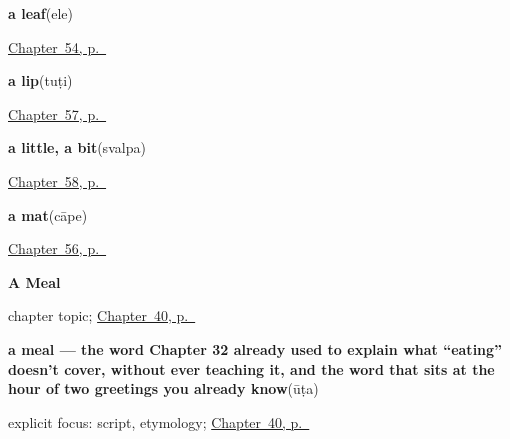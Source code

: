 \noindent\begin{minipage}[t]{\linewidth}
\raggedright
\textbf{a leaf}\enspace\emph{}\enspace(ele)\par
\footnotesize \hyperref[ch:ka-tree]{Chapter~54, p.~\pageref*{ch:ka-tree}}
\end{minipage}\par\smallskip

\noindent\begin{minipage}[t]{\linewidth}
\raggedright
\textbf{a lip}\enspace\emph{}\enspace(tuṭi)\par
\footnotesize \hyperref[ch:ka-more-body]{Chapter~57, p.~\pageref*{ch:ka-more-body}}
\end{minipage}\par\smallskip

\noindent\begin{minipage}[t]{\linewidth}
\raggedright
\textbf{a little, a bit}\enspace\emph{}\enspace(svalpa)\par
\footnotesize \hyperref[ch:ka-more-replies]{Chapter~58, p.~\pageref*{ch:ka-more-replies}}
\end{minipage}\par\smallskip

\noindent\begin{minipage}[t]{\linewidth}
\raggedright
\textbf{a mat}\enspace\emph{}\enspace(cāpe)\par
\footnotesize \hyperref[ch:ka-house]{Chapter~56, p.~\pageref*{ch:ka-house}}
\end{minipage}\par\smallskip

\noindent\begin{minipage}[t]{\linewidth}
\raggedright
\textbf{A Meal}\par
\footnotesize chapter topic; \hyperref[ch:ka-a-meal]{Chapter~40, p.~\pageref*{ch:ka-a-meal}}
\end{minipage}\par\smallskip

\noindent\begin{minipage}[t]{\linewidth}
\raggedright
\textbf{a meal — the word Chapter 32 already used to explain what \textquotedblleft{}eating\textquotedblright{} doesn't cover, without ever teaching it, and the word that sits at the hour of two greetings you already know}\enspace\emph{}\enspace(ūṭa)\par
\footnotesize explicit focus: script, etymology; \hyperref[ch:ka-a-meal]{Chapter~40, p.~\pageref*{ch:ka-a-meal}}
\end{minipage}\par\smallskip

